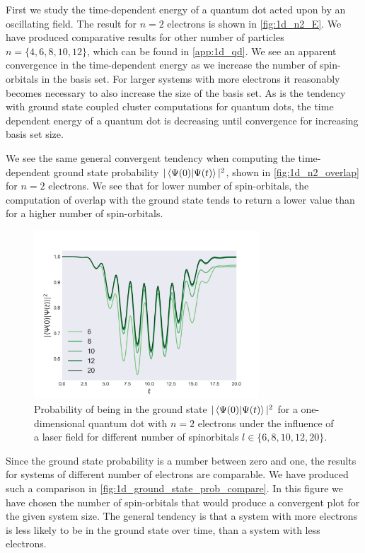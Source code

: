 First we study the time-dependent energy of a quantum dot acted upon by an oscillating 
field. The result for $n=2$ electrons is shown in \autoref{fig:1d_n2_E}. We have 
produced comparative results for other number of particles $n=\{4,6,8,10,12\}$,
which can be found in \autoref{app:1d_qd}. We see an apparent convergence in the 
time-dependent energy as we increase the number of spin-orbitals in the basis set.
For larger systems with more electrons it reasonably becomes necessary to also increase
the size of the basis set. As is the tendency with ground state coupled cluster computations
for quantum dots\cite{jorgensen2011many,lohne2010coupled}, the time dependent energy 
of a quantum dot is decreasing until convergence for increasing basis set size.

We see the same general convergent tendency when computing the time-dependent ground 
state probability $|\braket{\Psi(0)}{\Psi(t)}|^2$, shown in \autoref{fig:1d_n2_overlap} for $n=2$ electrons. We see that 
for lower number of spin-orbitals, the computation of overlap with 
the ground state tends to return a lower value than for a higher number of spin-orbitals.

\begin{figure}
    \centering
    \includegraphics[width=0.75\textwidth]{results/figures/1D/n=2overlap.png} 
    \caption{Probability of being in the ground state $|\braket*{\Psi(0)}{\Psi(t)}|^2$
        for a one-dimensional quantum dot with $n=2$ electrons under 
        the influence of a laser field for different number of spinorbitals 
        $l\in\{6,8,10,12,20\}$.
    }
    \label{fig:1d_n2_overlap}
\end{figure}

Since the ground state probability is a number between zero and one, the results for systems 
of different number of electrons are comparable. We have produced such a comparison in 
\autoref{fig:1d_ground_state_prob_compare}. In this figure we have chosen the number of
spin-orbitals that would produce a convergent plot for the given system size. The general 
tendency is that a system with more electrons is less likely to be in the ground state 
over time, than a system with less electrons.


